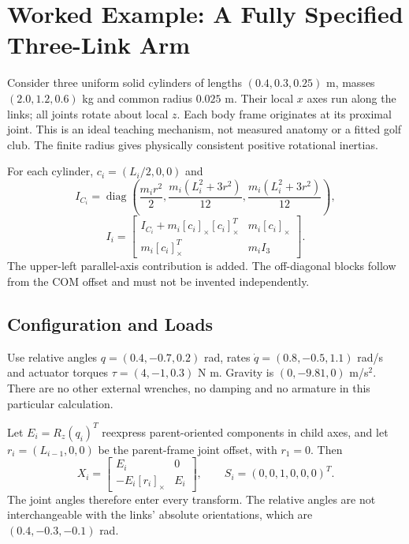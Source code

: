 \section{Worked Example: A Fully Specified Three-Link Arm}
\label{sec:worked_example_aba}

Consider three uniform solid cylinders of lengths $(0.4,0.3,0.25)$ m, masses $(2.0,1.2,0.6)$ kg and common radius $0.025$ m. Their local $x$ axes run along the links; all joints rotate about local $z$. Each body frame originates at its proximal joint. This is an ideal teaching mechanism, not measured anatomy or a fitted golf club. The finite radius gives physically consistent positive rotational inertias.

For each cylinder, $c_i=(L_i/2,0,0)$ and
\begin{equation}
 I_{C_i}=\operatorname{diag}
 \left(\frac{m_i r^2}{2},\frac{m_i(L_i^2+3r^2)}{12},
 \frac{m_i(L_i^2+3r^2)}{12}\right),
\end{equation}
\begin{equation}
 I_i=\begin{bmatrix}
 I_{C_i}+m_i[c_i]_\times[c_i]_\times^T&m_i[c_i]_\times\\
 m_i[c_i]_\times^T&m_i I_3
 \end{bmatrix}.
\end{equation}
The upper-left parallel-axis contribution is added. The off-diagonal blocks follow from the COM offset and must not be invented independently.

\subsection{Configuration and Loads}
\label{subsec:config_aba}

Use relative angles $q=(0.4,-0.7,0.2)$ rad, rates $\dot q=(0.8,-0.5,1.1)$ rad/s and actuator torques $\tau=(4,-1,0.3)$ N m. Gravity is $(0,-9.81,0)$ m/s$^2$. There are no other external wrenches, no damping and no armature in this particular calculation.

Let $E_i=R_z(q_i)^T$ reexpress parent-oriented components in child axes, and let $r_i=(L_{i-1},0,0)$ be the parent-frame joint offset, with $r_1=0$. Then
\begin{equation}
 X_i=\begin{bmatrix}E_i&0\\-E_i[r_i]_\times&E_i\end{bmatrix},
 \qquad S_i=(0,0,1,0,0,0)^T.
\end{equation}
The joint angles therefore enter every transform. The relative angles are not interchangeable with the links' absolute orientations, which are $(0.4,-0.3,-0.1)$ rad.

